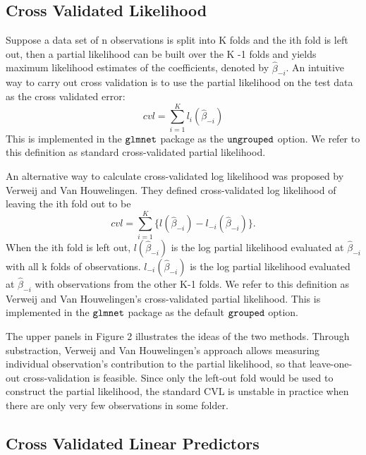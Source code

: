   \subsection{Cross Validated Likelihood} 
Suppose a data set of n observations is split into K folds and the ith fold is left out, then a partial likelihood can be built over the K -1 folds and yields maximum likelihood estimates of the coefficients, denoted by $\hat{\beta}_{-i}$. An intuitive way to carry out cross validation is to use the partial likelihood on the test data as the cross validated error: \begin{equation}cvl = \sum_{i=1}^{K} l_{i}(\hat{\beta}_{-i})\end{equation} This is implemented in the $\tt{glmnet}$ package as the $\tt{ungrouped}$ option. We refer to this definition as standard cross-validated partial likelihood.

\par An alternative way to calculate cross-validated log likelihood was proposed by Verweij and Van Houwelingen. They defined cross-validated log likelihood of leaving the ith fold out to be \begin{equation}cvl = \sum_{i=1}^{K} \{l(\hat{\beta}_{-i}) - l_{-i}(\hat{\beta}_{-i})\}. \end{equation} When the ith fold is left out, $l(\hat{\beta}_{-i})$ is the log partial likelihood evaluated at $\hat{\beta}_{-i}$ with all k folds of observations. $l_{-i}(\hat{\beta}_{-i})$ is the log partial likelihood evaluated at $\hat{\beta}_{-i}$ with observations from the other K-1 folds. We refer to this definition as Verweij and Van Houwelingen's cross-validated partial likelihood. This is implemented in the $\tt{glmnet}$ package as the default $\tt{grouped}$ option.

\par The upper panels in Figure 2 illustrates the ideas of the two methods. Through substraction, Verweij and Van Houwelingen's approach allows measuring individual observation's contribution to the partial likelihood, so that leave-one-out cross-validation is feasible. Since only the left-out fold would be used to construct the partial likelihood, the standard CVL is unstable in practice when there are only very few observations in some folder. 

  \subsection{Cross Validated Linear Predictors}

